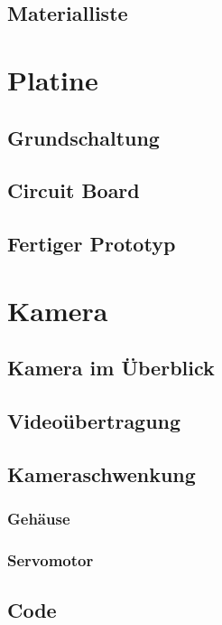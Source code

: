 \documentclass[ngerman,12pt,a4paper]{article}
\begin{document}
		\subsection{Materialliste} %
	\newpage
	\section{Platine}
	
		\subsection{Grundschaltung} %
		
		\subsection{Circuit Board} %
		
		\subsection{Fertiger Prototyp} %
	
	\newpage
	\section{Kamera}
	
		\subsection{Kamera im Überblick} %
		
		\subsection{Videoübertragung} %
		
		\subsection{Kameraschwenkung} %
		
			\subsubsection{Gehäuse} %
			
			\subsubsection{Servomotor} %
	
		\subsection{Code} %
		
\end{document}

